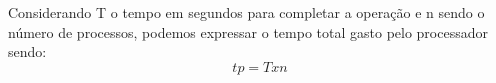 \newpage

\begin{question}
  Considerando T o tempo em segundos para completar a operação 
  e n sendo o número de processos, podemos expressar o tempo total gasto
  pelo processador sendo:
    \begin{equation*}
        tp = T x n
    \end{equation*}

\end{question}
